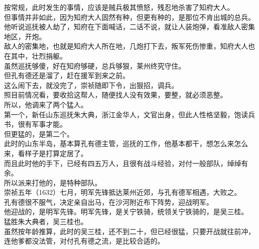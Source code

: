 \begin{multicols}{\theparacolNo}
按常规，此时发生的事情，应该是贼兵极其愤怒，残忍地杀害了知府大人。\\

但事情并非如此，因为知府大人固然有种，但更有种的，是那位不肯出城的总兵。\\

他听说巡抚被人劫了，知府在下面喊话，二话不说，就让人装炮弹，看准敌人密集地区，开炮。\\

敌人的密集地，也就是知府大人所在地，几炮打下去，叛军死伤惨重，知府大人也在其中，壮烈捐躯。\\

虽然巡抚够傻，好在知府够硬，总兵够狠，莱州终究守住。\\

但孔有德还是溜了，赶在援军到来之前。\\

这么闹下去，就没完了，崇祯随即下令，出狠招，调兵。\\

照目前情况看，要收拾这帮人，随便找人没有效果，要整，就必须恶整。\\

所以，他调来了两个猛人。\\

第一个，新任山东巡抚朱大典，浙江金华人，文官出身，但此人性格坚毅，饱读兵书，很有军事才能。\\

但更猛的，是第二个。\\

此时的山东半岛，基本算孔有德主管，巡抚的工作，他基本都干，想怎么来怎么来，看样子是打算定居了。\\

而且此时他的手下，已经有四五万人，且很有战斗经验，对付一般部队，绰绰有余。\\

所以派来打他的，是特种部队。\\

崇祯五年（1632）七月，明军先锋抵达莱州近郊，与孔有德军相遇，大败之。\\

孔有德很不服气，决定亲自出马，在沙河附近布下阵势，迎战明军。\\

他迎战的，是明军先锋。明军先锋，是关宁铁骑，统领关宁铁骑的，是吴三桂。\\

猛胜朱大典者，吴三桂也。\\

虽然按年龄推算，此时的吴三桂，还不到二十，但已经很猛，只要开战就往前冲，连他爹都没法管，对付孔有德之流，是比较合适的。\\


\end{multicols}
